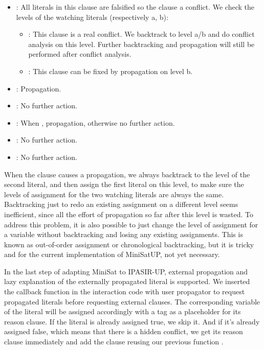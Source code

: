 \begin{itemize}
  \item {}: All literals in this clause are falsified so the clause a conflict. We check the levels of the watching literals (respectively a, b):
  \begin{itemize}
    \item {}: This clause is a real conflict. We backtrack to level a/b and do conflict analysis on this level. Further backtracking and propagation will still be performed after conflict analysis.
    \item {}: This clause can be fixed by propagation on level b.
  \end{itemize}
  \item {}: Propagation.
  \item {}: No further action.
  \item {}: When , propagation, otherwise no further action.
  \item {}: No further action.
  \item {}: No further action.
\end{itemize}

When the clause causes a propagation, we always backtrack to the level of the second literal, and then assign the first literal on this level, to make sure the levels of assignment for the two watching literals are always the same. Backtracking just to redo an existing assignment on a different level seems inefficient, since all the effort of propagation so far after this level is wasted. To address this problem, it is also possible to just change the level of assignment for a variable without backtracking and losing any existing assignments. This is known as out-of-order assignment or chronological backtracking, but it is tricky and for the current implementation of MiniSatUP, not yet necessary.

In the last step of adapting MiniSat to IPASIR-UP, external propagation and lazy explanation of the externally propagated literal is supported. We inserted the callback function  in the interaction code with user propagator to request propagated literals before requesting external clauses. The corresponding variable of the literal will be assigned accordingly with a tag  as a placeholder for its reason clause. If the literal is already assigned true, we skip it. And if it's already assigned false, which means that there is a hidden conflict, we get its reason clause immediately and add the clause reusing our previous function .

